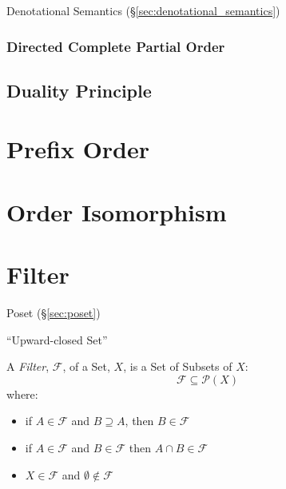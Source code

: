 Denotational Semantics (\S\ref{sec:denotational_semantics})



\subsubsection{Directed Complete Partial Order}\label{sec:dcpo}



\subsection{Duality Principle}\label{sec:duality_principle}



\section{Prefix Order}\label{sec:prefix_order}

\section{Order Isomorphism}\label{sec:order_isomorphism}

\section{Filter}\label{sec:filter}

Poset (\S\ref{sec:poset})

``Upward-closed Set''

A \emph{Filter}, $\mathcal{F}$, of a Set, $X$, is a Set of Subsets of
$X$:
\[
  \mathcal{F} \subseteq \mathcal{P}(X)
\]
where:
\begin{itemize}
\item if $A \in \mathcal{F}$ and $B \supseteq A$, then $B \in
  \mathcal{F}$
\item if $A \in \mathcal{F}$ and $B \in \mathcal{F}$ then $A \cap B
  \in \mathcal{F}$
\item $X \in \mathcal{F}$ and $\emptyset \notin \mathcal{F}$
\end{itemize}

